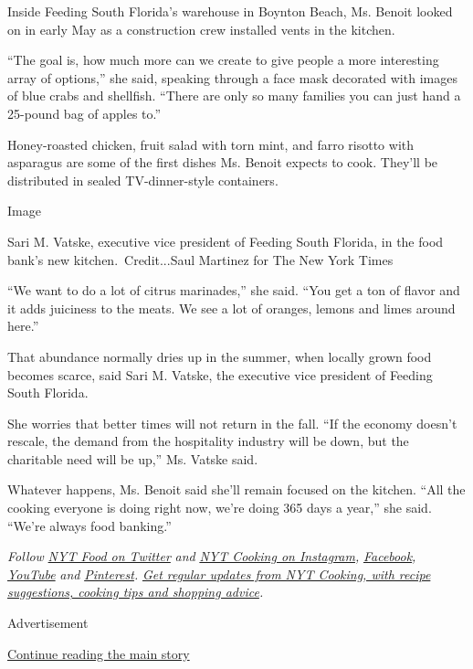 Inside Feeding South Florida's warehouse in Boynton Beach, Ms. Benoit
looked on in early May as a construction crew installed vents in the
kitchen.

``The goal is, how much more can we create to give people a more
interesting array of options,'' she said, speaking through a face mask
decorated with images of blue crabs and shellfish. ``There are only so
many families you can just hand a 25-pound bag of apples to.''

Honey-roasted chicken, fruit salad with torn mint, and farro risotto
with asparagus are some of the first dishes Ms. Benoit expects to cook.
They'll be distributed in sealed TV-dinner-style containers.

Image

Sari M. Vatske, executive vice president of Feeding South Florida, in
the food bank's new kitchen.~Credit...Saul Martinez for The New York
Times

``We want to do a lot of citrus marinades,'' she said. ``You get a ton
of flavor and it adds juiciness to the meats. We see a lot of oranges,
lemons and limes around here.''

That abundance normally dries up in the summer, when locally grown food
becomes scarce, said Sari M. Vatske, the executive vice president of
Feeding South Florida.

She worries that better times will not return in the fall. ``If the
economy doesn't rescale, the demand from the hospitality industry will
be down, but the charitable need will be up,'' Ms. Vatske said.

Whatever happens, Ms. Benoit said she'll remain focused on the kitchen.
``All the cooking everyone is doing right now, we're doing 365 days a
year,'' she said. ``We're always food banking.''

\emph{Follow} \href{https://twitter.com/nytfood}{\emph{NYT Food on
Twitter}} \emph{and}
\href{https://www.instagram.com/nytcooking/}{\emph{NYT Cooking on
Instagram}}\emph{,}
\href{https://www.facebookcorewwwi.onion/nytcooking/}{\emph{Facebook}}\emph{,}
\href{https://www.youtube.com/nytcooking}{\emph{YouTube}} \emph{and}
\href{https://www.pinterest.com/nytcooking/}{\emph{Pinterest}}\emph{.}
\href{https://www.nytimes3xbfgragh.onion/newsletters/cooking}{\emph{Get
regular updates from NYT Cooking, with recipe suggestions, cooking tips
and shopping advice}}\emph{.}

Advertisement

\protect\hyperlink{after-bottom}{Continue reading the main story}

